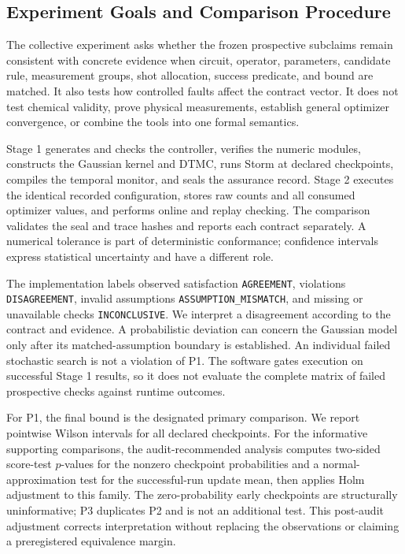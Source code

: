 \documentclass[conference]{IEEEtran}
\begin{document}
\subsection{Experiment Goals and Comparison Procedure}
The collective experiment asks whether the frozen prospective subclaims remain consistent with concrete evidence when circuit, operator, parameters, candidate rule, measurement groups, shot allocation, success predicate, and bound are matched. It also tests how controlled faults affect the contract vector. It does not test chemical validity, prove physical measurements, establish general optimizer convergence, or combine the tools into one formal semantics.

Stage 1 generates and checks the controller, verifies the numeric modules, constructs the Gaussian kernel and DTMC, runs Storm at declared checkpoints, compiles the temporal monitor, and seals the assurance record. Stage 2 executes the identical recorded configuration, stores raw counts and all consumed optimizer values, and performs online and replay checking. The comparison validates the seal and trace hashes and reports each contract separately. A numerical tolerance is part of deterministic conformance; confidence intervals express statistical uncertainty and have a different role.

The implementation labels observed satisfaction \texttt{AGREEMENT}, violations \texttt{DISAGREEMENT}, invalid assumptions \texttt{ASSUMPTION\_MISMATCH}, and missing or unavailable checks \texttt{INCONCLUSIVE}. We interpret a disagreement according to the contract and evidence. A probabilistic deviation can concern the Gaussian model only after its matched-assumption boundary is established. An individual failed stochastic search is not a violation of P1. The software gates execution on successful Stage 1 results, so it does not evaluate the complete matrix of failed prospective checks against runtime outcomes.

For P1, the final bound is the designated primary comparison. We report pointwise Wilson intervals for all declared checkpoints. For the informative supporting comparisons, the audit-recommended analysis computes two-sided score-test $p$-values for the nonzero checkpoint probabilities and a normal-approximation test for the successful-run update mean, then applies Holm adjustment to this family. The zero-probability early checkpoints are structurally uninformative; P3 duplicates P2 and is not an additional test. This post-audit adjustment corrects interpretation without replacing the observations or claiming a preregistered equivalence margin.
\end{document}
